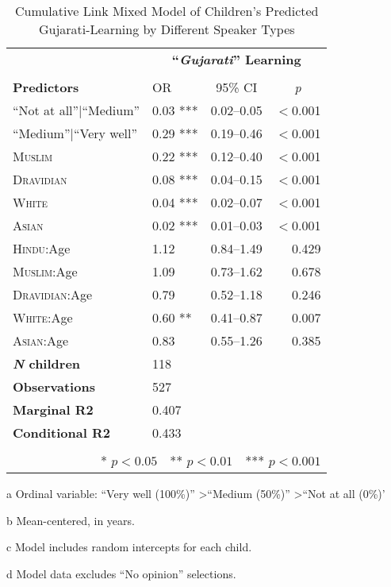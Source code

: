 \begin{table*}[t]
\small
\caption{Cumulative Link Mixed Model of Children's Predicted Gujarati-Learning by Different Speaker Types}\label{tab:wealth-ord}
    \centering
    \vspace{5pt}
\begin{threeparttable}
\begin{tabular}{llcr}
 \toprule
& \multicolumn{3}{c}{\textbf{``\textit{Gujarati}'' Learning}\tnote{a}} \\
\cline{2-4} \\[-.75em]
\textbf{Predictors} & {OR} & {95\% CI} & \multicolumn{1}{c}{\textit{p}} \\ 
\midrule
``Not at all''$|$``Medium'' & 0.03 *** & 0.02--0.05 & $<$0.001 \\ 
``Medium''$|$``Very well'' & 0.29 *** & 0.19--0.46 & $<$0.001 \\ 
  \textsc{Muslim} & 0.22 *** & 0.12--0.40 & $<$0.001 \\ 
  \textsc{Dravidian} & 0.08 *** & 0.04--0.15 & $<$0.001 \\ 
  \textsc{White} & 0.04 *** & 0.02--0.07 & $<$0.001 \\ 
  \textsc{Asian} & 0.02 *** & 0.01--0.03 & $<$0.001 \\ 
\textsc{Hindu}:Age\tnote{b}  & 1.12 & 0.84--1.49 & 0.429 \\ 
  \textsc{Muslim}:Age & 1.09 & 0.73--1.62 & 0.678 \\ 
  \textsc{Dravidian}:Age & 0.79 & 0.52--1.18 & 0.246 \\ 
  \textsc{White}:Age & 0.60 ** & 0.41--0.87 & 0.007 \\ 
  \textsc{Asian}:Age & 0.83 & 0.55--1.26 & 0.385 \\ 
\midrule
\bfseries{\textit{N} children}\tnote{c} & 118 &  &  \\ 
\textbf{Observations}\tnote{d} & 527 &  &  \\ 
 \textbf{Marginal R2} & 0.407 &&\\
 \textbf{Conditional R2} & 0.433 &  &  \\ 
\bottomrule\\[-.75em]
\multicolumn{4}{r}{* $p<0.05$~~** $p<0.01$~~*** $p<0.001$}\\
\end{tabular}
\begin{tablenotes}[flushleft]
    \item[a] Ordinal variable: ``Very well (100\%)'' \textgreater ``Medium (50\%)'' \textgreater ``Not at all (0\%)'
    \item[b] Mean-centered, in years.
    \item[c] Model includes random intercepts for each child.
    \item[d] Model data excludes ``No opinion'' selections. 
\end{tablenotes}
\end{threeparttable}
\end{table*}
